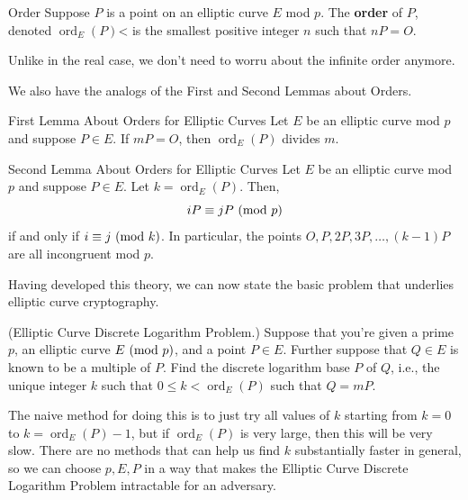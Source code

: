 \documentclass[letterpaper]{article}
\DeclareMathOperator{\ord}{ord}
\begin{document}
\begin{definition}{Order}{}
    Suppose $P$ is a point on an elliptic curve $E$ mod $p$. The \textbf{order} of $P$, denoted $\ord_{E}(P)$< is the smallest positive integer $n$ such that $nP = O$. 
\end{definition}
Unlike in the real case, we don't need to worru about the infinite order anymore. 

\bigskip 

We also have the analogs of the First and Second Lemmas about Orders. 
\begin{lemma}{First Lemma About Orders for Elliptic Curves}{}
    Let $E$ be an elliptic curve mod $p$ and suppose $P \in E$. If $mP = O$, then $\ord_{E}(P)$ divides $m$. 
\end{lemma}

\begin{lemma}{Second Lemma About Orders for Elliptic Curves}{}
    Let $E$ be an elliptic curve mod $p$ and suppose $P \in E$. Let $k = \ord_{E}(P)$. Then, \[iP \equiv jP \ (\mathrm{mod}\ p)\] if and only if $i \equiv j \ (\mathrm{mod}\ k)$. In particular, the points $O, P, 2P, 3P, \hdots, (k - 1)P$ are all incongruent mod $p$.
\end{lemma}
Having developed this theory, we can now state the basic problem that underlies elliptic curve cryptography. 
\begin{mdframed}
    (Elliptic Curve Discrete Logarithm Problem.) Suppose that you're given a prime $p$, an elliptic curve $E \ (\mathrm{mod}\ p)$, and a point $P \in E$. Further suppose that $Q \in E$ is known to be a multiple of $P$. Find the discrete logarithm base $P$ of $Q$, i.e., the unique integer $k$ such that $0 \leq k < \ord_{E}(P)$ such that $Q = mP$. 
\end{mdframed}
The naive method for doing this is to just try all values of $k$ starting from $k = 0$ to $k = \ord_{E}(P) - 1$, but if $\ord_{E}(P)$ is very large, then this will be very slow. There are no methods that can help us find $k$ substantially faster in general, so we can choose $p, E, P$ in a way that makes the Elliptic Curve Discrete Logarithm Problem intractable for an adversary. 
\end{document}
